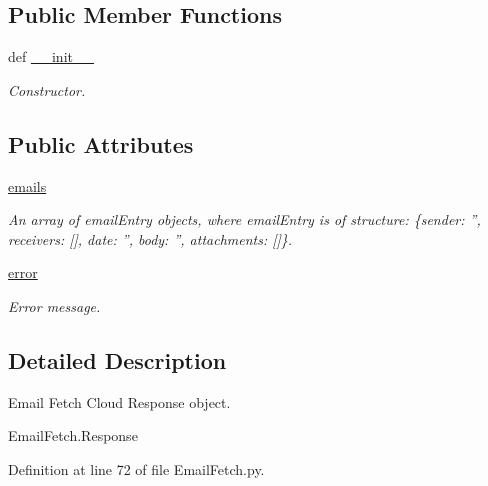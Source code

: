 \subsection*{Public Member Functions}
\begin{DoxyCompactItemize}
\item 
def \hyperlink{classRappCloud_1_1CloudMsgs_1_1EmailFetch_1_1EmailFetch_1_1Response_a945bb075a338cd05d095afa17f40a4b8}{\-\_\-\-\_\-init\-\_\-\-\_\-}
\begin{DoxyCompactList}\small\item\em Constructor. \end{DoxyCompactList}\end{DoxyCompactItemize}
\subsection*{Public Attributes}
\begin{DoxyCompactItemize}
\item 
\hyperlink{classRappCloud_1_1CloudMsgs_1_1EmailFetch_1_1EmailFetch_1_1Response_a352f4b262dfdc78b7640bd01803d3e84}{emails}
\begin{DoxyCompactList}\small\item\em An array of email\-Entry objects, where email\-Entry is of structure\-: \{sender\-: '', receivers\-: \mbox{[}\mbox{]}, date\-: '', body\-: '', attachments\-: \mbox{[}\mbox{]}\}. \end{DoxyCompactList}\item 
\hyperlink{classRappCloud_1_1CloudMsgs_1_1EmailFetch_1_1EmailFetch_1_1Response_a916a99b8a1d1ae9068299e7ea05d5c63}{error}
\begin{DoxyCompactList}\small\item\em Error message. \end{DoxyCompactList}\end{DoxyCompactItemize}


\subsection{Detailed Description}
\begin{DoxyVerb}Email Fetch Cloud Response object.

EmailFetch.Response
\end{DoxyVerb}
 

Definition at line 72 of file Email\-Fetch.\-py.



